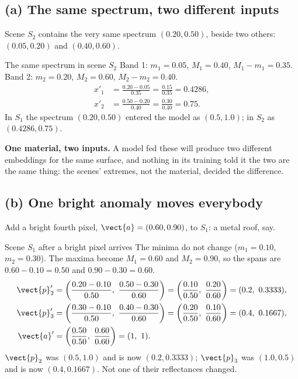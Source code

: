 \subsection{(a) The same spectrum, two different inputs}

Scene $S_2$ contains the very same spectrum $(0.20,0.50)$, beside two others: $(0.05,0.20)$ and $(0.40,0.60)$\tagA.

\begin{worked}[label={we:hslnorm:s2}]{The same spectrum in scene $S_2$}
Band 1: $m_1=0.05$, $M_1=0.40$, $M_1-m_1=0.35$. Band 2: $m_2=0.20$, $M_2=0.60$, $M_2-m_2=0.40$.
\begin{align*}
x'_1 &= \frac{0.20-0.05}{0.35} = \frac{0.15}{0.35} = 0.4286,\\
x'_2 &= \frac{0.50-0.20}{0.40} = \frac{0.30}{0.40} = 0.75 .
\end{align*}
In $S_1$ the spectrum $(0.20,0.50)$ entered the model as $(0.5,1.0)$; in $S_2$ as $(0.4286,0.75)$\tagC.
\end{worked}
\textbf{One material, two inputs.} A model fed these will produce two different embeddings for the same surface, and
nothing in its training told it the two are the same thing: the scenes' extremes, not the material, decided the
difference.

\subsection{(b) One bright anomaly moves everybody}

Add a bright fourth pixel, $\vect{a}=(0.60,0.90)$, to $S_1$\tagA: a metal roof, say.

\begin{worked}[label={we:hslnorm:anom}]{Scene $S_1$ after a bright pixel arrives}
The minima do not change ($m_1=0.10$, $m_2=0.30$). The maxima become $M_1=0.60$ and $M_2=0.90$, so the spans are
$0.60-0.10=0.50$ and $0.90-0.30=0.60$.
\begin{align*}
\vect{p}'_2 &= \left(\frac{0.20-0.10}{0.50},\ \frac{0.50-0.30}{0.60}\right)=\left(\frac{0.10}{0.50},\ \frac{0.20}{0.60}\right)=(0.2,\ 0.3333),\\
\vect{p}'_3 &= \left(\frac{0.30-0.10}{0.50},\ \frac{0.40-0.30}{0.60}\right)=\left(\frac{0.20}{0.50},\ \frac{0.10}{0.60}\right)=(0.4,\ 0.1667),\\
\vect{a}' &= \left(\frac{0.50}{0.50},\ \frac{0.60}{0.60}\right)=(1,\ 1).
\end{align*}
$\vect{p}_2$ was $(0.5,1.0)$ and is now $(0.2,0.3333)$; $\vect{p}_3$ was $(1.0,0.5)$ and is now $(0.4,0.1667)$\tagC. Not
one of their reflectances changed.
\end{worked}


